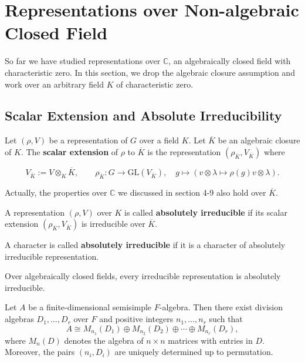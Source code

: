 
\chapter{Representations over Non-algebraic Closed Field}

So far we have studied representations over \(\mathbb{C}\), an algebraically closed field with characteristic zero. In this section, we drop the algebraic closure assumption and work over an arbitrary field \(K\) of characteristic zero.

\section{Scalar Extension and Absolute Irreducibility}

\begin{defn}
Let \((\rho, V)\) be a representation of \(G\) over a field \(K\). Let \(\overline{K}\) be an algebraic closure of \(K\). The \textbf{scalar extension} of \(\rho\) to \(\overline{K}\) is the representation $(\rho_{\overline{K}},V_{\overline{K}})$ where

\[V_{\overline{K}}:=V \otimes_K \overline{K},\qquad
\rho_{\overline{K}}: G \to \mathrm{GL}(V_{\overline{K}}), \quad g\mapsto(v \otimes \lambda\mapsto\rho(g)v \otimes \lambda).
\]
\end{defn}

\begin{remark}
Actually, the properties over $\mathbb C$ we discussed in section 4-9 also hold over \(\overline{K}\).
\end{remark}

\begin{defn}
A representation \((\rho, V)\) over \(K\) is called \textbf{absolutely irreducible} if its scalar extension $(\rho_{\overline{K}},V_{\overline{K}})$ is irreducible over \(\overline{K}\).

A character is called  \textbf{absolutely irreducible} if it is a character of absolutely irreducible representation.
\end{defn}

\begin{remark}
Over algebraically closed fields, every irreducible representation is absolutely irreducible. 
\end{remark}


\begin{lemma}
\label{thm:Artin--Wedderburn, General Field Version}
Let $A$ be a finite-dimensional semisimple $F$-algebra. Then there exist division algebras $D_1,\dots,D_r$ over $F$ and positive integers $n_1,\dots,n_r$ such that
\[
A \cong M_{n_1}(D_1) \oplus M_{n_2}(D_2) \oplus \cdots \oplus M_{n_r}(D_r),
\]
where $M_n(D)$ denotes the algebra of $n\times n$ matrices with entries in $D$. Moreover, the pairs $(n_i,D_i)$ are uniquely determined up to permutation.
\end{lemma}

